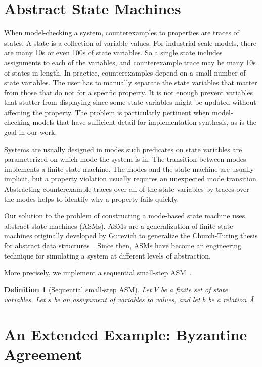 \documentclass{IEEEtran/IEEEtran}
\newtheorem{definition}{Definition}
\newcommand{\lee}[1]{ } %
\newcommand{\lee}[1]{ {\color{blue}$<$lee: #1$>$} } %
\begin{document}
\section{Abstract State Machines}\label{sec:abstract}\label{sec:asms}
When model-checking a system, counterexamples to properties are traces of states. A state is a collection of variable values. For industrial-scale models, there are many 10s or even 100s of state variables. So a single state includes assignments to each of the variables, and counterexample trace may be many 10s of states in length. In practice, counterexamples depend on a small number of state variables. The user has to manually separate the state variables that matter from those that do not for a specific property. It is not enough prevent variables that stutter from displaying since some state variables might be updated without affecting the property. The problem is particularly pertinent when model-checking models that have sufficient detail for implementation synthesis, as is the goal in our work.

Systems are usually designed in modes such predicates on state variables are parameterized on which mode the system is in. The transition between modes implements a finite state-machine. The modes and the state-machine are usually implicit, but a property violation usually requires an unexpected mode transition. Abstracting counterexample traces over all of the state variables by traces over the modes helps to identify why a property fails quickly.

Our solution to the problem of constructing a mode-based state machine uses abstract state machines (ASMs). ASMs are a generalization of finite state machines originally developed by Gurevich to generalize the Church-Turing thesis for abstract data structures~\cite{}. Since then, ASMs have become an engineering technique for simulating a system at different levels of abstraction.

\lee{http://www2.informatik.hu-berlin.de/sam/preprint/reisig203.pdf}
More precisely, we implement a sequential small-step ASM~\cite{}.
\begin{definition}[Sequential small-step ASM]
Let $V$ be a finite set of state variables. Let $s$ be an assignment of variables to values, and let $b$ be a relation Å
\end{definition}



\section{An Extended Example: Byzantine Agreement}\label{sec:byz}
\end{document}
